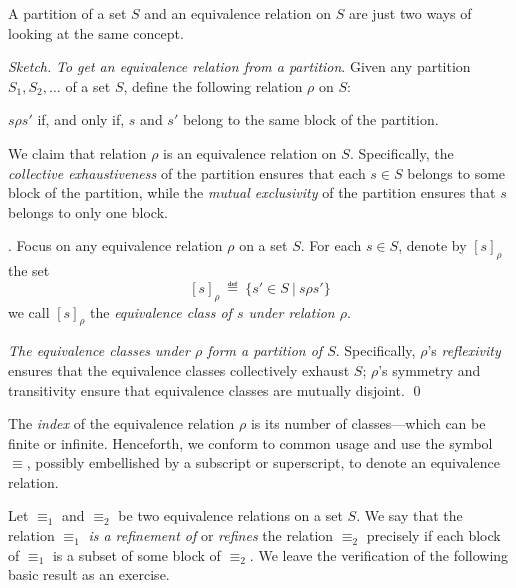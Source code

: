\begin{prop}
A partition of a set $S$ and an equivalence relation on $S$ are just two ways of looking at the same concept.
\end{prop}

\begin{proof}[Sketch]
{\it To get an equivalence relation from a partition}.
Given any partition $S_1, S_2, \ldots$ of a set $S$, define the following relation $\rho$ on $S$:

\smallskip

$s \rho s'$ if, and only if, $s$ and $s'$ belong to the same block of the partition.

\smallskip

\noindent
We claim that relation $\rho$ is an equivalence relation on $S$.  Specifically, the {\em collective exhaustiveness} of the partition ensures that each $s \in S$ belongs to some block of the partition, while the {\em mutual exclusivity} of the partition ensures that $s$ belongs to only one block.

\medskip
{}.
Focus on any equivalence relation $\rho$ on a set $S$.  For each $s \in S$, denote by $[s]_\rho$ the set
\[ [s]_\rho \ \eqdef \ \{ s' \in S \ | \ s \rho s' \} \]
we call $[s]_\rho$ the {\it equivalence class of $s$ under relation $\rho$}.
 

\smallskip

\noindent
{\em The equivalence classes under $\rho$ form a partition of $S$}.  Specifically, $\rho$'s {\em reflexivity} ensures that the equivalence classes collectively exhaust $S$; $\rho$'s symmetry and transitivity ensure that equivalence classes are mutually disjoint.  \qed
\end{proof}

  
  
The {\it index} of the equivalence relation $\rho$ is its number of classes---which can be finite or infinite.  Henceforth, we conform to common usage and use the symbol $\equiv$, possibly embellished by a subscript or superscript, to denote an equivalence relation.

\smallskip


Let $\equiv_1$ and $\equiv_2$ be two equivalence relations on a set $S$.  We say that the relation $\equiv_1$ {\em is a refinement of} or {\em refines} the relation $\equiv_2$ precisely if each block of $\equiv_1$ is a subset of some block of $\equiv_2$.  We leave the verification of the following basic result as an exercise.

